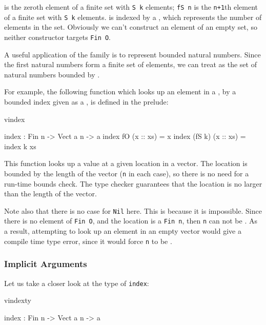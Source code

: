 \noindent
{} is the zeroth element of a finite set with \texttt{S k} elements; 
\texttt{fS n} is the
\texttt{n+1}th element of a finite set with \texttt{S k} elements. 
 is indexed by a , which
represents the number of elements in the set. Obviously we can't construct an
element of an empty set, so neither constructor targets \texttt{Fin O}.

A useful application of the  family is to represent bounded
natural numbers. Since the first  natural numbers form a finite
set of  elements, we can treat  as the set of natural
numbers bounded by . 

For example, the following function which looks up an element in a ,
by a bounded index given as a , is defined in the prelude:

\begin{SaveVerbatim}{vindex}

index : Fin n -> Vect a n -> a
index fO     (x :: xs) = x
index (fS k) (x :: xs) = index k xs

\end{SaveVerbatim}

\noindent
This function looks up a value at a given location in a vector. The location is
bounded by the length of the vector (\texttt{n} in each case), so there is no
need for a run-time bounds check. The type checker guarantees that the location
is no larger than the length of the vector.

Note also that there is no case for \texttt{Nil} here. This is because it is
impossible. Since there is no element of \texttt{Fin O}, and the location is a
\texttt{Fin n}, then \texttt{n} can not be .  As a result, attempting to
look up an element in an empty vector would give a compile time type error,
since it would force \texttt{n} to be .

\subsubsection{Implicit Arguments}

Let us take a closer look at the type of \texttt{index}:

\begin{SaveVerbatim}{vindexty}

index : Fin n -> Vect a n -> a

\end{SaveVerbatim}

